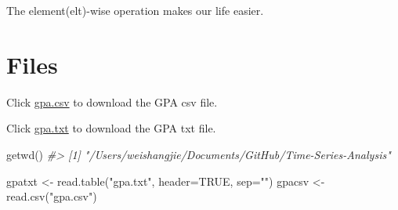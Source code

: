 \documentclass[
]{book}
\newenvironment{Shaded}{\begin{snugshade}}{\end{snugshade}}
\newcommand{\AttributeTok}[1]{\textcolor[rgb]{0.77,0.63,0.00}{#1}}
\newcommand{\CommentTok}[1]{\textcolor[rgb]{0.56,0.35,0.01}{\textit{#1}}}
\newcommand{\ConstantTok}[1]{\textcolor[rgb]{0.00,0.00,0.00}{#1}}
\newcommand{\FunctionTok}[1]{\textcolor[rgb]{0.00,0.00,0.00}{#1}}
\newcommand{\NormalTok}[1]{#1}
\newcommand{\OtherTok}[1]{\textcolor[rgb]{0.56,0.35,0.01}{#1}}
\newcommand{\SpecialCharTok}[1]{\textcolor[rgb]{0.00,0.00,0.00}{#1}}
\newcommand{\StringTok}[1]{\textcolor[rgb]{0.31,0.60,0.02}{#1}}
\begin{document}
The element(elt)-wise operation makes our life easier.

\hypertarget{files}{%
\section{Files}\label{files}}

Click \href{http://www.chrisbilder.com/stat878/sections/1/gpa.csv}{gpa.csv} to download the GPA csv file.

Click \href{http://www.chrisbilder.com/stat878/sections/1/gpa.txt}{gpa.txt} to download the GPA txt file.

\begin{Shaded}
\begin{Highlighting}[]
\FunctionTok{getwd}\NormalTok{()}
\CommentTok{\#\textgreater{} [1] "/Users/weishangjie/Documents/GitHub/Time{-}Series{-}Analysis"}
\end{Highlighting}
\end{Shaded}

\begin{Shaded}
\begin{Highlighting}[]
\NormalTok{gpatxt }\OtherTok{\textless{}{-}} \FunctionTok{read.table}\NormalTok{(}\StringTok{"gpa.txt"}\NormalTok{, }\AttributeTok{header=}\ConstantTok{TRUE}\NormalTok{, }\AttributeTok{sep=}\StringTok{""}\NormalTok{)}
\NormalTok{gpacsv }\OtherTok{\textless{}{-}} \FunctionTok{read.csv}\NormalTok{(}\StringTok{"gpa.csv"}\NormalTok{)}
\end{Highlighting}
\end{Shaded}

\begin{Shaded}
\end{Shaded}

\begin{Shaded}
\end{Shaded}
\end{document}
